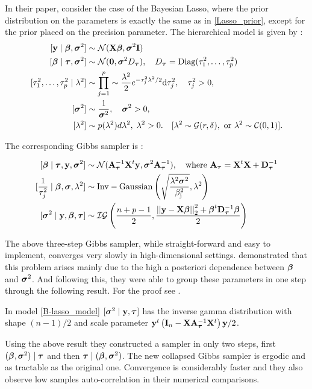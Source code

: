 \documentclass[10pt]{article}
\begin{document}
In their paper, \cite{Rajaratnam2017Gibbs} consider the case of the Bayesian Lasso, where the prior distribution on the parameters is exactly the same as in \eqref{Lasso_prior}, except for the prior placed on the precision parameter. The hierarchical model is given by : 
\begin{align}  \label{B-lasso_model}
[\y \mid \bbeta, \bsigma^2] & \sim \NormRV(\X \bbeta, \bsigma^2 \I) \nonumber \\
[\bbeta \mid \btau , \bsigma^2] & \sim \NormRV(\0, \bsigma^2 D_{\btau}), \quad D_{\btau} = \text{Diag}(\tau_1^2, \ldots, \tau_p^2) \nonumber \\
[\tau_1^2, \ldots, \tau_p^2 \mid \lambda^2] & \sim \prod_{j=1}^{p} \sim \frac{\lambda^2}{2} e^{-\tau_j^2\lambda^2/2} \d \tau_j^2, \quad \tau_j^2 > 0, \\
[\bsigma^2] & \sim \frac{1}{\bsigma^2} , \quad \bsigma^2 > 0, \nonumber  \\
[\lambda^2] & \sim p(\lambda^2) d\lambda^2,  \; \lambda^2 > 0. \quad [ \lambda^2 \sim \GammaRV(r, \delta), \text{ or } \lambda^2 \sim \CauchyRV(0,1) ]. \nonumber
\end{align}

The corresponding Gibbs sampler is :

\begin{align}  \label{B-lasso_gibbs}
[\bbeta \mid \btau ,\by , \bsigma^2] & \sim \NormRV(\A_{\btau}^{-1}\X^{t}\y, \bsigma^2 \A_{\btau}^{-1}), \quad \text{where } \A_{\btau} = \X^{t}\X + \D_{\btau}^{-1} \nonumber \\
[\frac{1}{\tau_j^2} \mid \bbeta ,\bsigma , \lambda^2] & \sim \rm{Inv-Gaussian}\left( \sqrt{\frac{\lambda^2\bsigma^2}{\beta_j^2}} , \lambda^2 \right) \\
[\bsigma^2 \mid \y ,\bbeta ,\btau] & \sim \mathcal{IG}\left( \frac{n+p-1}{2} , \frac{\vectornorm{\y - \X \bbeta}^{2}_{2} + \bbeta^{t}\D^{-1}_{\btau}\bbeta}{2} \right) \nonumber 
\end{align}

The above three-step Gibbs sampler, while straight-forward and easy to implement, converges very slowly in high-dimensional settings. \cite{Rajaratnam2017Gibbs} demonstrated that this problem arises mainly due to the high a posteriori dependence between $\boldsymbol{\beta}$ and $\boldsymbol{\sigma}^2$. And following this, they were able to group these parameters in one step through the following result. For the proof see \cite{Rajaratnam2017Gibbs}.

\begin{lemma}\label{sigma_collapsed}
In model \eqref{B-lasso_model} $[ \boldsymbol{\sigma}^2 \mid {\bf y} ,\boldsymbol{\tau} ]$ has the inverse gamma distribution with shape $(n-1)/2$ and scale parameter ${\bf y}^{t}\left( {\bf I}_n - {\bf X}{\bf A}_{\boldsymbol{\tau}}^{-1}{\bf X}^{t} \right){\bf y} /2 $.
\end{lemma}
Using the above result they constructed a sampler in only two steps, first $(\boldsymbol{\beta} , \boldsymbol{\sigma}^2) \mid  \boldsymbol{\tau}$ and then $\boldsymbol{\tau} \mid (\boldsymbol{\beta} , \boldsymbol{\sigma}^2)$. The new collapsed Gibbs sampler is ergodic and as tractable as the original one. Convergence is considerably faster and they also observe low samples auto-correlation in their numerical comparisons.
\end{document}
